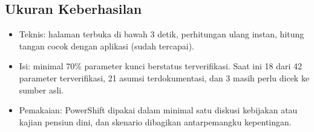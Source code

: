 \subsection{Ukuran Keberhasilan}

\begin{itemize}
  \item Teknis: halaman terbuka di bawah 3 detik, perhitungan ulang instan, hitung tangan cocok dengan aplikasi (sudah tercapai).
  \item Isi: minimal 70\% parameter kunci berstatus terverifikasi. Saat ini 18 dari 42 parameter terverifikasi, 21 asumsi terdokumentasi, dan 3 masih perlu dicek ke sumber asli.
  \item Pemakaian: PowerShift dipakai dalam minimal satu diskusi kebijakan atau kajian pensiun dini, dan skenario dibagikan antarpemangku kepentingan.
\end{itemize}
